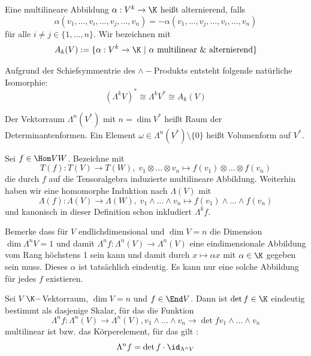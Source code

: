 \documentclass[11pt, a4paper]{article}
\begin{document}
\begin{definition}
    Eine multilineare Abbildung $\alpha: V^k \to \K$ heißt alternierend, falls
    $$\alpha(v_1,...,v_i,...,v_j,...,v_n)= -\alpha(v_1,...,v_j,...,v_i,...,v_n)$$
    für alle $i\neq j \in \{1,...,n\}$. Wir bezeichnen mit 
    $$A_k(V) := \{\alpha: V^k \to \K \ | \ \alpha \text{ multilinear \& alternierend}\}$$
\end{definition}

\begin{corollary}
    Aufgrund der Schiefsymmentrie des $\wedge-$Produkts entsteht folgende natürliche Isomorphie:
    $$(\Lambda^k V)^* \cong \Lambda^k V^* \cong A_k (V)$$
\end{corollary}

\begin{definition}[Volumenformen] Der Vektorraum $\Lambda^n(V^*)$ mit $n= \dim V^*$ heißt Raum der Determinantenformen. Ein Element $\omega \in \Lambda^n(V^*)\setminus \{0\}$ heißt Volumenform auf $V^*$.
\end{definition}

\begin{definition}
    Sei $f\in \Hom V W$. Bezeichne mit 
    $$T(f): T(V) \to T(W), \; v_1\otimes ...\otimes v_n \mapsto f(v_1) \otimes ...\otimes f(v_n) $$
    die durch $f$ auf die Tensoralgebra induzierte multilineare Abbildung. Weiterhin haben wir eine homomorphe Induktion nach $\Lambda(V)$ mit 
    $$\Lambda(f): \Lambda(V) \to \Lambda(W), \; v_1\wedge ...\wedge v_n \mapsto f(v_1) \wedge ...\wedge f(v_n) $$
    und kanonisch in dieser Definition schon inkludiert $\Lambda^k f$. 
\end{definition}

\begin{note}
    Bemerke dass für $V$ endlichdimensional und $\dim V = n$ die Dimension $\dim \Lambda ^n V = 1$ und damit 
    $\Lambda ^n f: \Lambda^n(V) \to \Lambda^n(V)$ eine eindimensionale Abbildung vom Rang höchstens 1 sein kann und damit durch $x\mapsto \alpha x$ mit $\alpha\in \K$ gegeben sein muss. Dieses $\alpha $ ist tatsächlich eindeutig. Es kann nur eine solche Abbildung für jedes $f$ existieren.
\end{note}

\begin{definition} Sei $V$ $\K-$Vektorraum, $\dim V= n$ und $f\in \End V$. Dann ist $\det f \in \K$ eindeutig bestimmt als dasjenige Skalar, für das die Funktion 
$$\Lambda^n f: \Lambda^n (V) \to \Lambda^n(V), v_1 \wedge ...\wedge v_n \to \det f v_1 \wedge ...\wedge v_n $$
multilinear ist bzw. das Körperelement, für das gilt :
$$\Lambda^n f = \det f \cdot \id_{\Lambda^n V}$$
\end{definition}
\end{document}
